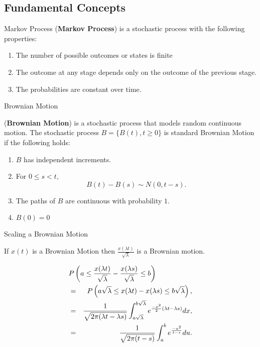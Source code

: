 \subsection{Fundamental Concepts}
%
\begin{frame}{Markov Process}
(\textbf{Markov Process}) is a stochastic process with the following properties: 
\begin{enumerate}
\item The number of possible outcomes or states is finite
\item The outcome at any stage depends only on the outcome of the previous stage.
\item The probabilities are constant over time.   
\end{enumerate}
\end{frame}


\begin{frame}{Brownian Motion}
\begin{definition}(\textbf{Brownian Motion}) is a stochastic process that models random continuous motion. The stochastic process $B=\{B(t), t\geq 0\}$ is standard Brownian Motion if the following holds:
\begin{enumerate}
\item $B$ has independent increments.
\item For $0 \leq s < t,$ $$B(t)-B(s) \sim N(0,t-s).$$
\item The paths of $B$ are continuous with probability $1$.
\item $B(0)=0$ 
\end{enumerate}
\end{definition}
\end{frame}

\begin{frame}

  \cite{doi:10.1137/S0036144500378302}
\end{frame}


\begin{frame}{Scaling a Brownian Motion}
\vfill

If $x(t)$ is a Brownian Motion then 
$\displaystyle \frac{x(\lambda t)}{\sqrt{\lambda}}$ 
is a Brownian motion.
	
\vfill
\begin{eqnarray*}
  \lefteqn{
	P \left(a \leq \frac{x(\lambda t)}{\sqrt{\lambda}}-\frac{x(\lambda s)}{\sqrt{\lambda}} \leq b \right)
	} & & \\
    & = & P \left(a \sqrt{\lambda} \leq x(\lambda t) - x (\lambda s) \leq b \sqrt{\lambda} \right), \\
	& = & \displaystyle \frac{1}{\sqrt{2 \pi (\lambda t -\lambda s)}} 
                    \int_{a \sqrt{\lambda}}^{b \sqrt{\lambda}} e^{\frac{-x^2}{2}(\lambda t- \lambda s)} dx, \\
    & = & \frac{1}{\sqrt{2 \pi (t-s)}} \int_{a}^{b} e^{\frac{-u^2}{t-s}}du.
 \end{eqnarray*}
\end{frame}

